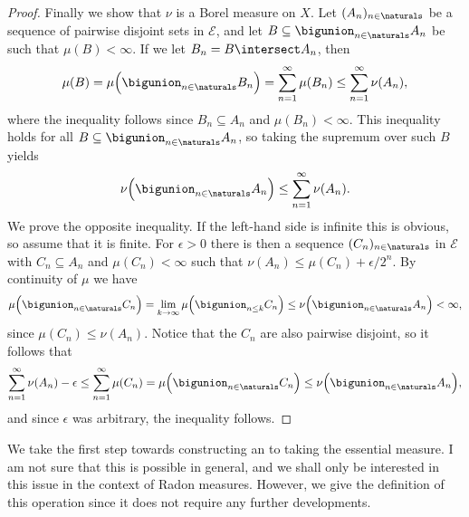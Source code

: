 \documentclass[article, a4paper, 11pt, oneside]{memoir}
\numberwithin{equation}{chapter}
\newcommand{\calE}{\mathcal{E}}
\begin{document}
\begin{proof}
    Finally we show that $\nu$ is a Borel measure on $X$. Let $(A_n)_{n \in \naturals}$ be a sequence of pairwise disjoint sets in $\calE$, and let $B \subseteq \bigunion_{n \in \naturals} A_n$ be such that $\mu(B) < \infty$. If we let $B_n = B \intersect A_n$, then
    \begin{equation*}
        \mu(B)
            = \mu \Bigl( \bigunion_{n \in \naturals} B_n \Bigr)
            = \sum_{n=1}^\infty \mu(B_n)
            \leq \sum_{n=1}^\infty \nu(A_n),
    \end{equation*}
    where the inequality follows since $B_n \subseteq A_n$ and $\mu(B_n) < \infty$. This inequality holds for all $B \subseteq \bigunion_{n \in \naturals} A_n$, so taking the supremum over such $B$ yields
    \begin{equation*}
        \nu \Bigl( \bigunion_{n \in \naturals} A_n \Bigr)
            \leq \sum_{n=1}^\infty \nu(A_n).
    \end{equation*}
    We prove the opposite inequality. If the left-hand side is infinite this is obvious, so assume that it is finite. For $\epsilon > 0$ there is then a sequence $(C_n)_{n \in \naturals}$ in $\calE$ with $C_n \subseteq A_n$ and $\mu(C_n) < \infty$ such that $\nu(A_n) \leq \mu(C_n) + \epsilon/2^n$. By continuity of $\mu$ we have
    \begin{equation*}
        \mu \Bigl( \bigunion_{n \in \naturals} C_n \Bigr)
            = \lim_{k \to \infty} \mu \Bigl( \bigunion_{n \leq k} C_n \Bigr)
            \leq \nu \Bigl( \bigunion_{n \in \naturals} A_n \Bigr)
            < \infty,
    \end{equation*}
    since $\mu(C_n) \leq \nu(A_n)$. Notice that the $C_n$ are also pairwise disjoint, so it follows that
    \begin{equation*}
        \sum_{n=1}^\infty \nu(A_n) - \epsilon
            \leq \sum_{n=1}^\infty \mu(C_n)
            = \mu \Bigl( \bigunion_{n \in \naturals} C_n \Bigr)
            \leq \nu \Bigl( \bigunion_{n \in \naturals} A_n \Bigr),
    \end{equation*}
    and since $\epsilon$ was arbitrary, the inequality follows.
\end{proof}

We take the first step towards constructing an  to taking the essential measure. I am not sure that this is possible in general, and we shall only be interested in this issue in the context of Radon measures. However, we give the definition of this  operation since it does not require any further developments.
\end{document}
